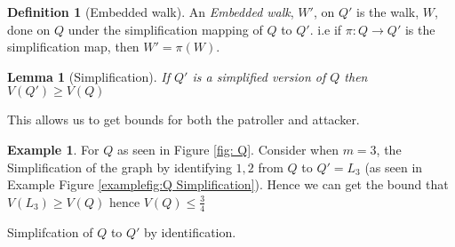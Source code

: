 \documentclass[a4paper,10pt]{article}
\newtheorem{lemma}[theorem]{Lemma}
\theoremstyle{definition}
\newtheorem{definition}[theorem]{Definition}
\theoremstyle{definition}
\newtheorem{example}[theorem]{Example}
\theoremstyle{remark}
\theoremstyle{definition}
\begin{document}
\begin{definition}[Embedded walk]
An \textit{Embedded walk}, $W'$, on $Q'$ is the walk, $W$, done on $Q$ under the simplification mapping of $Q$ to $Q'$. i.e if $\pi :Q \rightarrow Q'$ is the simplification map, then $W'=\pi (W)$.
\end{definition}

\begin{lemma}[Simplification]
If $Q'$ is a simplified version of $Q$ then $V(Q') \geq V(Q)$
\end{lemma}

This allows us to get bounds for both the patroller and attacker.

\begin{example}
For $Q$ as seen in Figure \ref{fig: Q}. Consider when $m=3$, the Simplification of the graph by identifying $1,2$ from $Q$ to $Q'=L_{3}$ (as seen in Example Figure \ref{examplefig:Q Simplification}). Hence we can get the bound that $V(L_{3}) \geq  V(Q)$ hence $V(Q) \leq \frac{3}{4} $
\end{example}

\begin{myfigure}
\begin{center}
\end{center}
\caption{Simplifcation of $Q$ to $Q'$ by identification.}
\label{examplefig:Q Simplification}
\end{myfigure}
\end{document}
